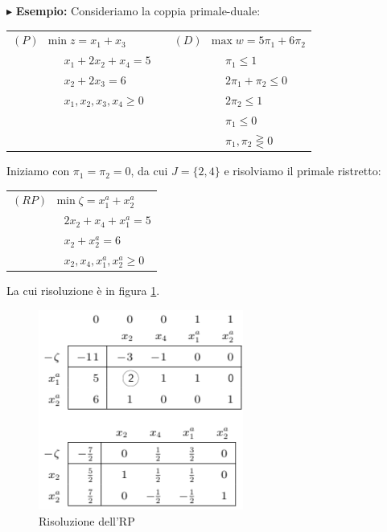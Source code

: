 \documentclass[11pt]{book}
\begin{document}
\vspace{11pt}$\blacktriangleright$ {\bf Esempio:} Consideriamo la
coppia primale-duale:

\begin{center}
\begin{tabular}{lp{3cm}l}
$(P)\phantom{a}\min z = x_1 + x_3$ && $(D)\phantom{a}\max w =
  5\pi_1+6\pi_2$\\
$\phantom{(p)mina}x_1 + 2x_2 + x_4 = 5$ && $\phantom{(p)mina}\pi_1 \leq 1$\\
$\phantom{(p)mina}x_2 + 2x_3 = 6$ && $\phantom{(p)mina}2\pi_1 + \pi_2 \leq 0$ \\
$\phantom{(p)mina}x_1,x_2,x_3,x_4 \geq 0$ && $\phantom{(p)mina}2\pi_2 \leq 1$\\
&& $\phantom{(p)mina}\pi_1 \leq 0$\\
&& $\phantom{(p)mina}\pi_1, \pi_2 \gtreqless 0$
\end{tabular}
\end{center}

Iniziamo con $\pi_1 = \pi_2 = 0$, da cui $J = \{2,4\}$ e risolviamo il
primale ristretto:

\vspace{11pt}
\begin{center}
\begin{tabular}{l}
$(RP)\phantom{a}\min \zeta = x_1^a + x_2^a$\\
$\phantom{(p)mina}2x_2 + x_4 + x_1^a = 5$\\
$\phantom{(p)mina}x_2 + x_2^a = 6$\\
$\phantom{(p)mina}x_2,x_4,x_1^a,x_2^a \geq 0$\\
\end{tabular}
\end{center}
\vspace{11pt}

La cui risoluzione \`e in figura \ref{cap5tab59}.

\begin{figure}[h!]
  \centering
  \includegraphics[width=0.6\textwidth]{images/cap5tab59.png}
  \caption{Risoluzione dell'RP}
  \label{cap5tab59}
\end{figure}
\end{document}
